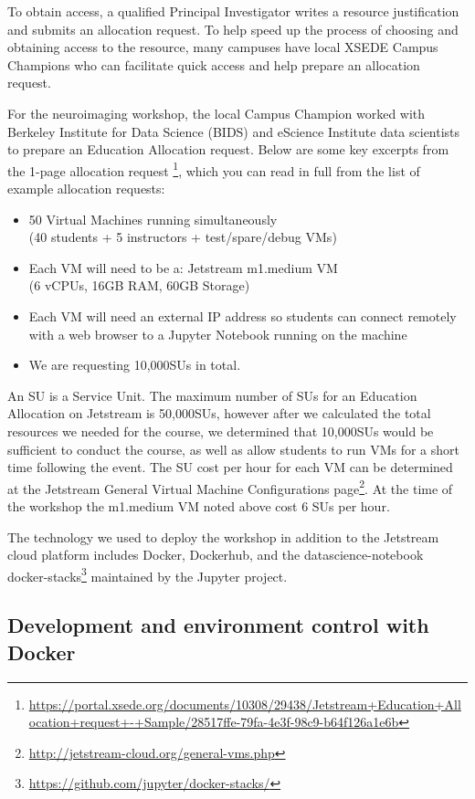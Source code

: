 To obtain access, a qualified Principal Investigator writes a resource
justification and submits an allocation request. To help speed up the
process of choosing and obtaining access to the resource, many campuses
have local XSEDE Campus Champions who can facilitate quick access and
help prepare an allocation request.

For the neuroimaging workshop, the local Campus Champion worked with Berkeley
Institute for Data Science (BIDS) and eScience Institute data scientists to
prepare an Education Allocation request. Below are some key excerpts from the
1-page allocation request \footnote{\url{https://portal.xsede.org/documents/10308/29438/Jetstream+Education+Allocation+request+-+Sample/28517ffe-79fa-4e3f-98c9-b64f126a1e6b}},
which you can read in full from the list of example allocation requests:

\begin{itemize}
\item 50 Virtual Machines running simultaneously \\(40 students + 5 instructors +
test/spare/debug VMs)
\item Each VM will need to be a: Jetstream m1.medium VM \\(6 vCPUs, 16GB RAM, 60GB
  Storage)
\item Each VM will need an external IP address so students can connect remotely
  with a web browser to a Jupyter Notebook running on the machine
\item We are requesting 10,000SUs in total.
\end{itemize}

An SU is a Service Unit. The maximum number of SUs for an Education Allocation
on Jetstream is 50,000SUs, however after we calculated the total resources we
needed for the course, we determined that 10,000SUs would be sufficient to
conduct the course, as well as allow students to run VMs for a short time
following the event. The SU cost per hour for each VM can be determined at the
Jetstream General Virtual Machine Configurations page\footnote{\url{http://jetstream-cloud.org/general-vms.php}}.
At the time of the workshop the m1.medium VM noted above cost 6 SUs per hour.

The technology we used to deploy the workshop in addition to the Jetstream cloud
platform includes Docker, Dockerhub, and the datascience-notebook docker-stacks\footnote{\url{https://github.com/jupyter/docker-stacks/}}
maintained by the Jupyter project.

\subsection{Development and environment control with Docker}

